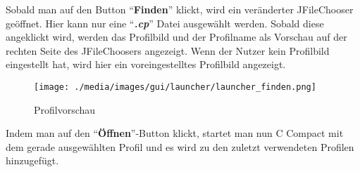 Sobald man auf den Button "`\textbf{Finden}"' klickt, wird ein veränderter JFileChooser geöffnet. Hier kann nur eine "`\textit{\textbf{.cp}}"' Datei ausgewählt werden. Sobald diese angeklickt wird, werden das Profilbild und der Profilname als Vorschau auf der rechten Seite des JFileChoosers angezeigt. Wenn der Nutzer kein Profilbild eingestellt hat, wird hier ein voreingestelltes Profilbild angezeigt.

\begin{figure}[h] 
   \centering
     \texttt{[image: ./media/images/gui/launcher/launcher\_finden.png]}
  \caption{ Profilvorschau}
  \label{fig:Bild1}
\end{figure}

Indem man auf den "`\textbf{Öffnen}"'-Button klickt, startet man nun C Compact mit dem gerade ausgewählten Profil und es wird zu den zuletzt verwendeten Profilen hinzugefügt.
